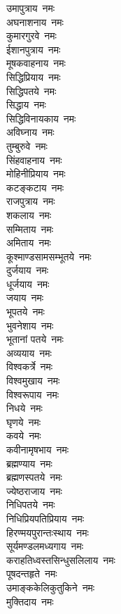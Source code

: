 \begin{multicols}{2}
\begin{flushleft}
उमापुत्राय~नमः\\
अघनाशनाय~नमः\\
कुमारगुरवे~नमः\\
ईशानपुत्राय~नमः\\
मूषकवाहनाय~नमः\\
सिद्धिप्रियाय~नमः\\
सिद्धिपतये~नमः\\
सिद्धाय~नमः\hfill{}\\
सिद्धिविनायकाय~नमः\\
अविघ्नाय~नमः\\
तुम्बुरुवे~नमः\\
सिंहवाहनाय~नमः\\
मोहिनीप्रियाय~नमः\\
कटङ्कटाय~नमः\\
राजपुत्राय~नमः\\
शकलाय~नमः\\
सम्मिताय~नमः\\
अमिताय~नमः\hfill{}\\
कूश्माण्डसामसम्भूतये~नमः\\
दुर्जयाय~नमः\\
धूर्जयाय~नमः\\
जयाय~नमः\\
भूपतये~नमः\\
भुवनेशाय~नमः\\
भूतानां पतये~नमः\\
अव्ययाय~नमः\\
विश्वकर्त्रे~नमः\\
विश्वमुखाय~नमः\hfill{}\\
विश्वरूपाय~नमः\\
निधये~नमः\\
घृणये~नमः\\
कवये~नमः\\
कवीनामृषभाय~नमः\\
ब्रह्मण्याय~नमः\\
ब्रह्मणस्पतये~नमः\\
ज्येष्ठराजाय~नमः\\
निधिपतये~नमः\\
निधिप्रियपतिप्रियाय~नमः\hfill{}\\
हिरण्मयपुरान्तःस्थाय~नमः\\
सूर्यमण्डलमध्यगाय~नमः\\
कराहतिध्वस्तसिन्धुसलिलाय~नमः\\
पूषदन्तहृते~नमः\\
उमाङ्ककेलिकुतुकिने~नमः\\
मुक्तिदाय~नमः\\

\end{flushleft}
\end{multicols}
